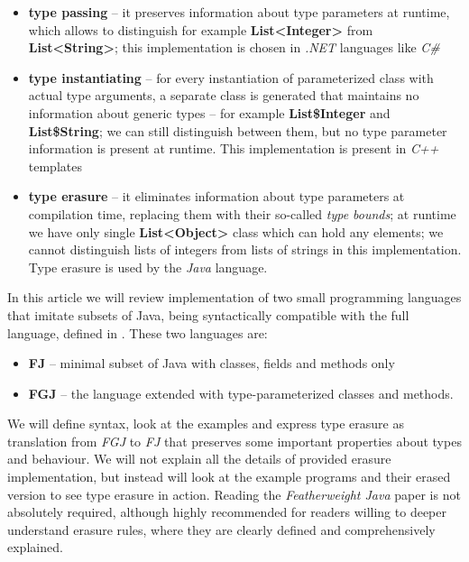 \documentclass{article}[12pt]
\begin{document}
\begin{itemize}

\item{\textbf{type passing}} -- it preserves information about
  type parameters at runtime, which allows to distinguish
  for example \textbf{List<Integer>} from \textbf{List<String>}; 
  this implementation is chosen in \emph{.NET} languages like
  \emph{C\#}

\item{\textbf{type instantiating}} -- for every instantiation of
  parameterized class with actual type arguments, a separate
  class is generated that maintains no information about generic
  types -- for example \textbf{List\$Integer} and \textbf{List\$String};
  we can still distinguish between them, but no type parameter
  information is present at runtime. This implementation is present
  in \emph{C++} templates

\item{\textbf{type erasure}} -- it eliminates information about
  type parameters at compilation time, replacing them with their
  so-called \emph{type bounds}; at runtime we have only single
  \textbf{List<Object>} class which can hold any elements; we cannot
  distinguish lists of integers from lists of strings in this
  implementation. Type erasure is used by the \emph{Java} language.

\end{itemize}


In this article we will review implementation of two small
programming languages that imitate subsets of Java, being
syntactically compatible with the full language, defined in
\cite{fj}. These two languages are:

\begin{itemize}
\item{\textbf{FJ}} -- minimal subset of Java with classes,
fields and methods only
\item{\textbf{FGJ}} -- the language extended with
type-parameterized classes and methods.
\end{itemize}


We will define syntax, look at the examples and express type
erasure as translation from \emph{FGJ} to \emph{FJ} that
preserves some important properties about types and behaviour.
We will not explain all the details of provided erasure
implementation, but instead will look at the example programs
and their erased version to see type erasure in action. Reading
the \emph{Featherweight Java} paper is not absolutely required,
although highly recommended for readers willing to deeper
understand erasure rules, where they are clearly defined and
comprehensively explained.
\end{document}
